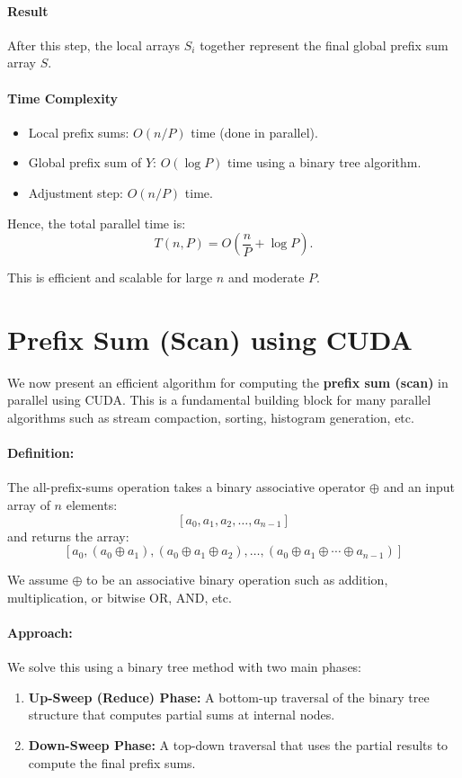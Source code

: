 \documentclass[12pt]{book}
\begin{document}
\paragraph{Result}
After this step, the local arrays $S_i$ together represent the final global prefix sum array $S$.

\paragraph{Time Complexity}
\begin{itemize}
    \item Local prefix sums: $O(n/P)$ time (done in parallel).
    \item Global prefix sum of $Y$: $O(\log P)$ time using a binary tree algorithm.
    \item Adjustment step: $O(n/P)$ time.
\end{itemize}

Hence, the total parallel time is:
\[
T(n, P) = O\left(\frac{n}{P} + \log P\right).
\]

This is efficient and scalable for large $n$ and moderate $P$.

\section{Prefix Sum (Scan) using CUDA}

We now present an efficient algorithm for computing the \textbf{prefix sum (scan)} in parallel using CUDA. This is a fundamental building block for many parallel algorithms such as stream compaction, sorting, histogram generation, etc.

\paragraph{Definition:}
The all-prefix-sums operation takes a binary associative operator $\oplus$ and an input array of $n$ elements:
\[
[a_0, a_1, a_2, \ldots, a_{n-1}]
\]
and returns the array:
\[
[a_0, (a_0 \oplus a_1), (a_0 \oplus a_1 \oplus a_2), \ldots, (a_0 \oplus a_1 \oplus \cdots \oplus a_{n-1})]
\]

We assume $\oplus$ to be an associative binary operation such as addition, multiplication, or bitwise OR, AND, etc.

\paragraph{Approach:} 
We solve this using a binary tree method with two main phases:
\begin{enumerate}
    \item \textbf{Up-Sweep (Reduce) Phase:} A bottom-up traversal of the binary tree structure that computes partial sums at internal nodes.
    \item \textbf{Down-Sweep Phase:} A top-down traversal that uses the partial results to compute the final prefix sums.
\end{enumerate}
\end{document}
